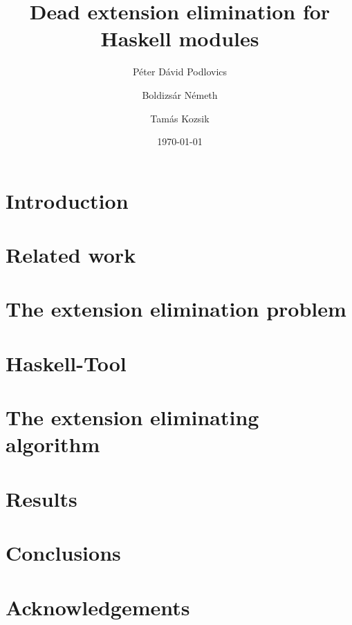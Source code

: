 \documentclass[11pt]{amsart}
\title{Dead extension elimination for Haskell modules}
\date{\today}
\author{Péter Dávid Podlovics}
\author{Boldizsár Németh}
\author{Tamás Kozsik}
\begin{document}
	
	
	\maketitle

	\section{Introduction}
	
	
	\vspace{-0.2cm}
	\section{Related work}
	
	
	\section{The extension elimination problem} \label{ext-elim_problem}
	
	
	\section{Haskell-Tool}
	
	
	\section{The extension eliminating algorithm} \label{algorithm}
	
	
	\section{Results}
	
	
	\section{Conclusions}
	
	
	\section*{Acknowledgements}
	
	
	
	
\end{document}
